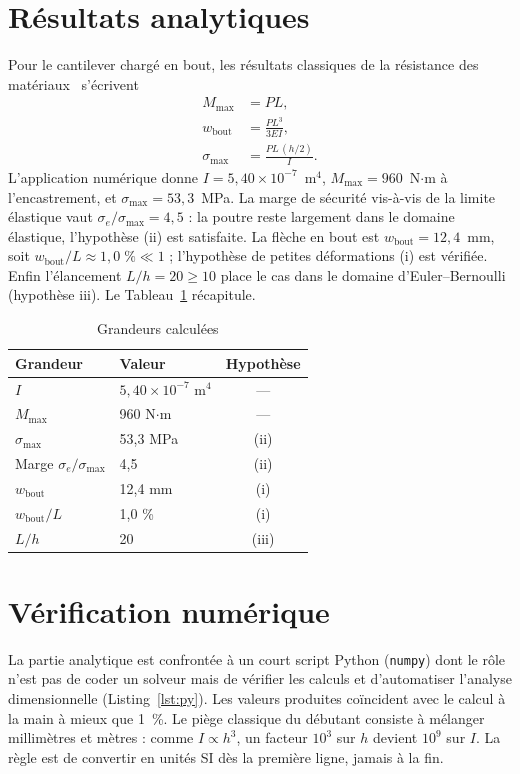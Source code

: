 \documentclass[10pt,journal]{IEEEtran}
\begin{document}
\section{Résultats analytiques}
Pour le cantilever chargé en bout, les résultats classiques de la résistance des matériaux~\cite{gere} s'écrivent
\begin{align}
M_{\max} &= P L, \\
w_{\text{bout}} &= \frac{P L^3}{3 EI}, \\
\sigma_{\max} &= \frac{P L\,(h/2)}{I}.
\end{align}
L'application numérique donne $I = 5{,}40\times 10^{-7}$~m$^4$, $M_{\max}=960$~N$\cdot$m à l'encastrement, et $\sigma_{\max}=53{,}3$~MPa. La marge de sécurité vis-à-vis de la limite élastique vaut $\sigma_e/\sigma_{\max}=4{,}5$ : la poutre reste largement dans le domaine élastique, l'hypothèse (ii) est satisfaite. La flèche en bout est $w_{\text{bout}}=12{,}4$~mm, soit $w_{\text{bout}}/L \approx 1{,}0\;\% \ll 1$ ; l'hypothèse de petites déformations (i) est vérifiée. Enfin l'élancement $L/h=20\ge 10$ place le cas dans le domaine d'Euler--Bernoulli (hypothèse iii). Le Tableau~\ref{tab:res} récapitule.

\begin{table}[!t]
\caption{Grandeurs calculées}
\label{tab:res}
\centering
\begin{tabular}{@{}llc@{}}
\toprule
Grandeur & Valeur & Hypothèse \\
\midrule
$I$ & $5{,}40\times10^{-7}$ m$^4$ & --- \\
$M_{\max}$ & 960 N$\cdot$m & --- \\
$\sigma_{\max}$ & 53,3 MPa & (ii) \\
Marge $\sigma_e/\sigma_{\max}$ & 4,5 & (ii) \\
$w_{\text{bout}}$ & 12,4 mm & (i) \\
$w_{\text{bout}}/L$ & 1,0 \% & (i) \\
$L/h$ & 20 & (iii) \\
\bottomrule
\end{tabular}
\end{table}

\section{Vérification numérique}
La partie analytique est confrontée à un court script Python (\texttt{numpy}) dont le rôle n'est pas de \og coder un solveur\fg{} mais de vérifier les calculs et d'automatiser l'analyse dimensionnelle (Listing~\ref{lst:py}). Les valeurs produites coïncident avec le calcul à la main à mieux que 1~\%. Le piège classique du débutant consiste à mélanger millimètres et mètres : comme $I \propto h^3$, un facteur $10^3$ sur $h$ devient $10^9$ sur $I$. La règle est de convertir en unités SI dès la première ligne, jamais à la fin.
\end{document}
